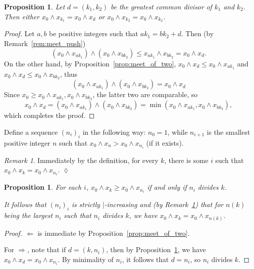 \documentclass[final,a4paper,12pt,reqno]{amsart}
\newcommand{\meet}{\mathop{\wedge}}
\newtheorem{prop}[thm]{Proposition}
\theoremstyle{remark}
\newtheorem{rem}[thm]{Remark}
\theoremstyle{definition}
\newcommand{\xqed}[1]{%
	\leavevmode\unskip\penalty9999 \hbox{}\nobreak\hfill
	\quad\hbox{\ensuremath{#1}}}
\let \leq \leqslant
\let \geq \geqslant
\begin{document}
	\begin{prop}
		\label{prop:gcd_meet}
		Let $d=(k_1,k_2)$ be the greatest common divisor of $k_1$ and $k_2$. Then either $x_0\meet x_{k_1}=x_0\meet x_d$ or $x_0\meet x_{k_2}=x_0\meet x_{k_2}$.
	\end{prop}
	\begin{proof}
		Let $a,b$ be positive integers such that $ak_1=bk_2+d$. Then (by Remark~\ref{rem:meet_push})
		\[
			(x_0\meet x_{ak_1})\meet (x_0\meet x_{bk_2})\leq x_{ak_1}\meet x_{bk_2}=x_0\meet x_d.
		\]
		On the other hand, by Proposition~\ref{prop:meet_of_two}, $x_0\meet x_d\leq x_0\meet x_{ak_1}$ and $x_0\meet x_d\leq x_0\meet x_{bk_2}$, thus
		\[
			(x_0\meet x_{ak_1})\meet (x_0\meet x_{bk_2})=x_0\meet x_d
		\]
		Since $x_0\geq x_0\meet x_{ak_1}, x_0\meet x_{bk_2}$, the latter two are comparable, so
		\[
			x_0\meet x_d=(x_0\meet x_{ak_1})\meet (x_0\meet x_{bk_2})=\min(x_0\meet x_{ak_1}, x_0\meet x_{bk_2}),
		\]
		which completes the proof.
	\end{proof}
	Define a sequence $(n_i)_i$ in the following way: $n_0=1$, while $n_{i+1}$ is the smallest positive integer $n$ such that $x_0\meet x_{n}>x_0\meet x_{n_i}$ (if it exists).
	\begin{rem}
		\label{rem:all_ni}
		Immediately by the definition, for every $k$, there is some $i$ such that $x_0\meet x_k=x_0\meet x_{n_i}$.\xqed{\lozenge}
	\end{rem}
	
	
	
	\begin{prop}
		\label{prop:less_iff_divides}
		For each $i$, $x_0\meet x_k\geq x_0\meet x_{n_i}$ if and only if $n_i$ divides $k$.
		
		It follows that $(n_i)_i$ is strictly $\mid$-increasing and (by Remark~\ref{rem:all_ni}) that for $n(k)$ being the largest $n_i$ such that $n_i$ divides $k$, we have $x_0\meet x_k=x_0\meet x_{n(k)}$.
	\end{prop}
	\begin{proof}
		$\Leftarrow$ is immediate by Proposition~\ref{prop:meet_of_two}.
		
		For $\Rightarrow$, note that if $d=(k,n_i)$, then by Proposition~\ref{prop:gcd_meet}, we have $x_0\meet x_d=x_0\meet x_{n_i}$. By minimality of $n_i$, it follows that $d=n_i$, so $n_i$ divides $k$.
	\end{proof}
	
\end{document}
